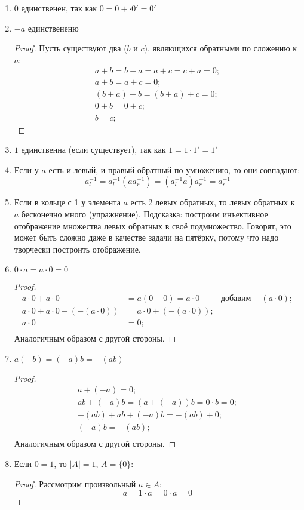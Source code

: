 \begin{enumerate}
\item $0$ единственен, так как $0 = 0 + \cdot 0' = 0'$
\item $-a$ единствененю
	\begin{proof}
	Пусть существуют два ($b$ и $c$), являющихся обратными по сложению к $a$:
	\begin{gather*}
		a + b = b + a = a + c = c + a = 0; \\
		a + b = a + c = 0; \\
		(b + a) + b = (b + a) + c = 0; \\
		0 + b = 0 + c ; \\
		b = c; 
	\end{gather*}
	\end{proof}
\item $1$ единственна (если существует), так как $1 = 1 \cdot 1' = 1'$
\item Если у $a$ есть и левый, и правый обратный по умножению, то они совпадают: \[a^{-1}_l = a^{-1}_l(aa^{-1}_r) = (a^{-1}_la)a^{-1}_r = a^{-1}_r\]
\item Если в кольце с 1 у элемента $a$ есть 2 левых обратных, то левых обратных к $a$ бесконечно много (упражнение).
Подсказка: построим инъективное отображение множества левых обратных в своё подмножество. Говорят, это может
быть сложно даже в качестве задачи на пятёрку, потому что надо творчески построить отображение.
	
\item $0 \cdot a = a \cdot 0 = 0 $
	\begin{proof}
		\begin{align*}
		a \cdot 0 + a \cdot 0 &= a(0 + 0) = a\cdot0 & \text{добавим} -(a\cdot0); \\
		a \cdot 0 + a \cdot 0 + (-(a \cdot 0)) &= a \cdot 0 + (-(a \cdot 0)); \\
		a \cdot 0 &= 0; \\
		\end{align*}
		Аналогичным образом с другой стороны.
	\end{proof}
\item $ a(-b) = (-a)b = -(ab)$
	\begin{proof}
		\begin{gather*}
		a + (-a) = 0; \\
		ab + (-a)b = (a + (-a))b = 0 \cdot b = 0; \\
		-(ab) + ab + (-a)b = -(ab) + 0; \\
		(-a)b = -(ab); \\
		\end{gather*}
		Аналогичным образом с другой стороны.
	\end{proof}
\item Если $0 = 1$, то $|A| = 1$, $A = \{0\}$:
	\begin{proof}
		Рассмотрим произвольный $a \in A$:
		\[a = 1 \cdot a = 0 \cdot a = 0\]
	\end{proof}
\end{enumerate}

